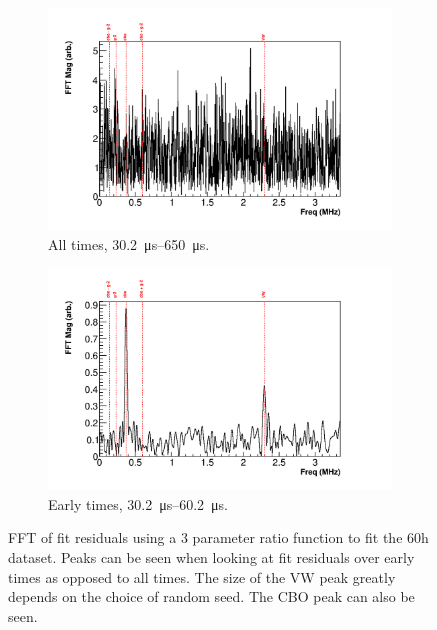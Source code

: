 \documentclass[12pt,letterpaper]{article}
\begin{document}
\begin{figure}[]
\centering
    \begin{subfigure}[t]{0.7\textwidth}
        \centering
        \includegraphics[width=\textwidth]{FFT_3param_allTimes} %
        \caption{All times, \SIrange{30.2}{650}{\micro s}.}
    \end{subfigure}%

    \begin{subfigure}[t]{0.7\textwidth}
        \centering
        \includegraphics[width=\textwidth]{FFT_3param_earlyTimes} %
        \caption{Early times, \SIrange{30.2}{60.2}{\micro s}.}
    \end{subfigure}
\caption[]{FFT of fit residuals using a 3 parameter ratio function to fit the 60h dataset. Peaks can be seen when looking at fit residuals over early times as opposed to all times. The size of the VW peak greatly depends on the choice of random seed. The CBO peak can also be seen.}
\label{fig:FFT_3param}
\end{figure}
\end{document}
